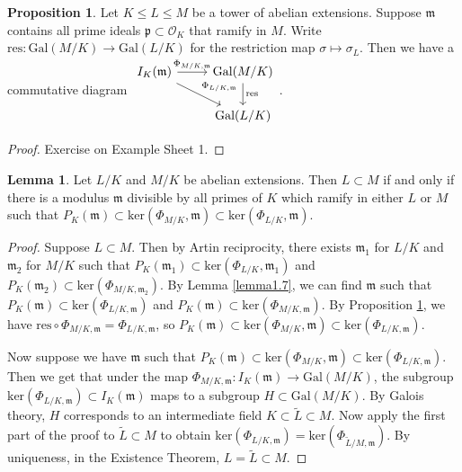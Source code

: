 \documentclass{article}
\theoremstyle{definition}
\newtheorem{lemma}[theorem]{Lemma}
\newtheorem{prop}[theorem]{Proposition}
\begin{document}
\begin{prop}\label{prop1.12}
    Let $K\le L\le M$ be a tower of abelian extensions. Suppose $\mathfrak{m}$ contains all prime ideals $\mathfrak{p} \subset \mathcal{O}_K$ that ramify in $M$. Write $\text{res}: \text{Gal}(M/K) \to \text{Gal}(L/K)$ for the restriction map $\sigma \mapsto \sigma_L$. Then we have a commutative diagram $\begin{tikzcd}[]
        I_K(\mathfrak{m}) & \text{Gal}(M/K)\\
         & \text{Gal}(L/K)
        \arrow["\Phi_{M/K,\mathfrak{m}}", from=1-1, to=1-2]
        \arrow["\text{res}", from=1-2, to=2-2]
        \arrow["\Phi_{L/K,\mathfrak{m}}", from=1-1, to=2-2]
    \end{tikzcd}$. 
\end{prop}
\begin{proof}
    Exercise on Example Sheet 1.
\end{proof}
\begin{lemma}\label{lemma1.13}
    Let $L/K$ and $M/K$ be abelian extensions. Then $ L \subset M$ if and only if there is a modulus $\mathfrak{m}$ divisible by all primes of $K$ which ramify in either $L$ or $M$ such that $P_K(\mathfrak{m}) \subset \text{ker}(\Phi_{M/K},\mathfrak{m}) \subset \text{ker}(\Phi_{L/K},\mathfrak{m})$.
\end{lemma}
\begin{proof}
    Suppose $L \subset M$. Then by Artin reciprocity, there exists $\mathfrak{m}_1$ for $L/K$ and $\mathfrak{m}_2$ for $M/K$ such that $P_K(\mathfrak{m_1}) \subset \text{ker}(\Phi_{L/K},\mathfrak{m}_1)$ and $P_K(\mathfrak{m}_2) \subset \text{ker}(\Phi_{M/K,\mathfrak{m}_2})$. By Lemma \ref{lemma1.7}, we can find $\mathfrak{m}$ such that $P_K(\mathfrak{m}) \subset \text{ker}(\Phi_{L/K,\mathfrak{m}})$ and $P_K(\mathfrak{m}) \subset \text{ker}(\Phi_{M/K,\mathfrak{m}})$. By Proposition \ref{prop1.12}, we have $\text{res} \circ \Phi_{M/K,\mathfrak{m}} = \Phi_{L/K,\mathfrak{m}}$, so $P_K(\mathfrak{m}) \subset \text{ker}(\Phi_{M/K}, \mathfrak{m}) \subset \text{ker}(\Phi_{L/K,\mathfrak{m}})$.
    \vspace{1mm}
     
    Now suppose we have $\mathfrak{m}$ such that $P_K(\mathfrak{m}) \subset \text{ker}(\Phi_{M/K}, \mathfrak{m}) \subset \text{ker}(\Phi_{L/K,\mathfrak{m}})$. Then we get that under the map $\Phi_{M/K,\mathfrak{m}} : I_K(\mathfrak{m}) \to \text{Gal}(M/K)$, the subgroup $\text{ker}(\Phi_{L/K,\mathfrak{m}}) \subset I_K(\mathfrak{m})$ maps to a subgroup $H \subset \text{Gal}(M/K)$. By Galois theory, $H$ corresponds to an intermediate field $K \subset \tilde{L} \subset M$. Now apply the first part of the proof to $\tilde{L}\subset M$ to obtain  $\text{ker}(\Phi_{L/K,\mathfrak{m}}) = \text{ker}(\Phi_{\tilde{L}/M,\mathfrak{m}})$. By uniqueness, in the Existence Theorem, $L = \tilde{L} \subset M$.
\end{proof}
\end{document}
